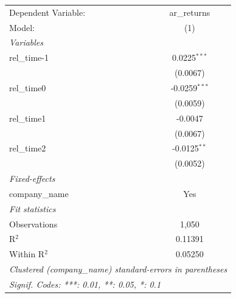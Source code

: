 
\begingroup
\centering
\begin{tabular}{lc}
   \tabularnewline \midrule \midrule
   Dependent Variable: & ar\_returns\\   
   Model:              & (1)\\  
   \midrule
   \emph{Variables}\\
   rel\_time-1         & 0.0225$^{***}$\\   
                       & (0.0067)\\   
   rel\_time0          & -0.0259$^{***}$\\   
                       & (0.0059)\\   
   rel\_time1          & -0.0047\\   
                       & (0.0067)\\   
   rel\_time2          & -0.0125$^{**}$\\   
                       & (0.0052)\\   
   \midrule
   \emph{Fixed-effects}\\
   company\_name       & Yes\\  
   \midrule
   \emph{Fit statistics}\\
   Observations        & 1,050\\  
   R$^2$               & 0.11391\\  
   Within R$^2$        & 0.05250\\  
   \midrule \midrule
   \multicolumn{2}{l}{\emph{Clustered (company\_name) standard-errors in parentheses}}\\
   \multicolumn{2}{l}{\emph{Signif. Codes: ***: 0.01, **: 0.05, *: 0.1}}\\
\end{tabular}
\par\endgroup


